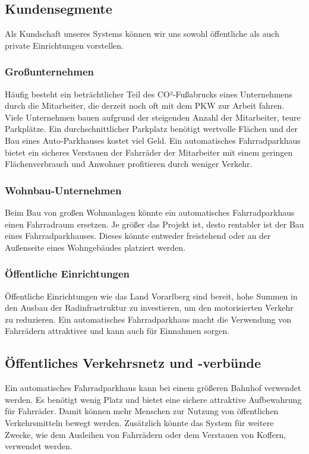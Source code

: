 \subsection{Kundensegmente}
Als Kundschaft unseres Systems können wir uns sowohl öffentliche als auch private Einrichtungen vorstellen. \\

\subsubsection{Großunternehmen}
Häufig besteht ein beträchtlicher Teil des CO²-Fußabrucks eines Unternehmens durch die Mitarbeiter, die derzeit noch oft mit dem PKW zur Arbeit fahren. Viele Unternehmen bauen aufgrund der steigenden Anzahl der Mitarbeiter, teure Parkplätze. Ein durchschnittlicher Parkplatz benötigt wertvolle Flächen und der Bau eines Auto-Parkhauses kostet viel Geld. Ein automatisches Fahrradparkhaus bietet ein sicheres Verstauen der Fahrräder der Mitarbeiter mit einem geringen Flächenverbrauch und Anwohner profitieren durch weniger Verkehr.\\

\subsubsection{Wohnbau-Unternehmen}
Beim Bau von großen Wohnanlagen könnte ein automatisches Fahrradparkhaus einen Fahrradraum ersetzen. Je größer das Projekt ist, desto rentabler ist der Bau eines Fahrradparkhauses. Dieses könnte entweder freistehend oder an der Außenseite eines Wohngebäudes platziert werden.\\

\subsubsection{Öffentliche Einrichtungen}
Öffentliche Einrichtungen wie das Land Vorarlberg sind bereit, hohe Summen in den Ausbau der Radinfrastruktur zu investieren, um den motorisierten Verkehr zu reduzieren. Ein automatisches Fahrradparkhaus macht die Verwendung von Fahrrädern attraktiver und kann auch für Einnahmen sorgen.\\

\subsection{Öffentliches Verkehrsnetz und -verbünde}
Ein automatisches Fahrradparkhaus kann bei einem größeren Bahnhof verwendet werden. Es benötigt wenig Platz und bietet eine sichere attraktive Aufbewahrung für Fahrräder. Damit können mehr Menschen zur Nutzung von öffentlichen Verkehrsmitteln bewegt werden. Zusätzlich könnte das System für weitere Zwecke, wie dem Ausleihen von Fahrrädern oder dem Verstauen von Koffern, verwendet werden.\\



